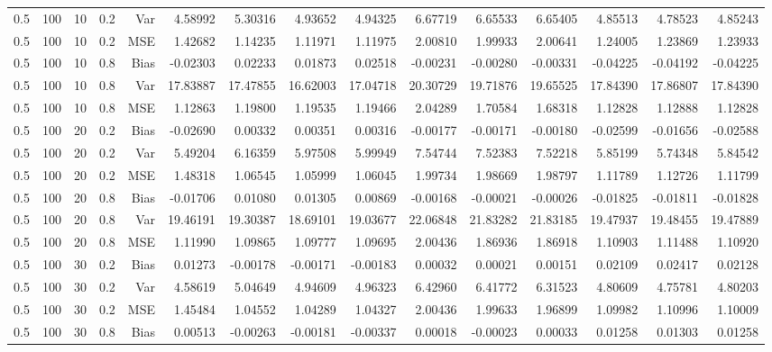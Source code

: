 \begin{table}[!htbp]
\begin{tabular}{lrrrrrrrrrrrrrr}
0.5 & 100 & 10 & 0.2 & Var & 4.58992 & 5.30316 & 4.93652 & 4.94325 & 6.67719 & 6.65533 & 6.65405 & 4.85513 & 4.78523 & 4.85243 \\
0.5 & 100 & 10 & 0.2 & MSE & 1.42682 & 1.14235 & 1.11971 & 1.11975 & 2.00810 & 1.99933 & 2.00641 & 1.24005 & 1.23869 & 1.23933 \\
0.5 & 100 & 10 & 0.8 & Bias & -0.02303 & 0.02233 & 0.01873 & 0.02518 & -0.00231 & -0.00280 & -0.00331 & -0.04225 & -0.04192 & -0.04225 \\
0.5 & 100 & 10 & 0.8 & Var & 17.83887 & 17.47855 & 16.62003 & 17.04718 & 20.30729 & 19.71876 & 19.65525 & 17.84390 & 17.86807 & 17.84390 \\
0.5 & 100 & 10 & 0.8 & MSE & 1.12863 & 1.19800 & 1.19535 & 1.19466 & 2.04289 & 1.70584 & 1.68318 & 1.12828 & 1.12888 & 1.12828 \\
0.5 & 100 & 20 & 0.2 & Bias & -0.02690 & 0.00332 & 0.00351 & 0.00316 & -0.00177 & -0.00171 & -0.00180 & -0.02599 & -0.01656 & -0.02588 \\
0.5 & 100 & 20 & 0.2 & Var & 5.49204 & 6.16359 & 5.97508 & 5.99949 & 7.54744 & 7.52383 & 7.52218 & 5.85199 & 5.74348 & 5.84542 \\
0.5 & 100 & 20 & 0.2 & MSE & 1.48318 & 1.06545 & 1.05999 & 1.06045 & 1.99734 & 1.98669 & 1.98797 & 1.11789 & 1.12726 & 1.11799 \\
0.5 & 100 & 20 & 0.8 & Bias & -0.01706 & 0.01080 & 0.01305 & 0.00869 & -0.00168 & -0.00021 & -0.00026 & -0.01825 & -0.01811 & -0.01828 \\
0.5 & 100 & 20 & 0.8 & Var & 19.46191 & 19.30387 & 18.69101 & 19.03677 & 22.06848 & 21.83282 & 21.83185 & 19.47937 & 19.48455 & 19.47889 \\
0.5 & 100 & 20 & 0.8 & MSE & 1.11990 & 1.09865 & 1.09777 & 1.09695 & 2.00436 & 1.86936 & 1.86918 & 1.10903 & 1.11488 & 1.10920 \\
0.5 & 100 & 30 & 0.2 & Bias & 0.01273 & -0.00178 & -0.00171 & -0.00183 & 0.00032 & 0.00021 & 0.00151 & 0.02109 & 0.02417 & 0.02128 \\
0.5 & 100 & 30 & 0.2 & Var & 4.58619 & 5.04649 & 4.94609 & 4.96323 & 6.42960 & 6.41772 & 6.31523 & 4.80609 & 4.75781 & 4.80203 \\
0.5 & 100 & 30 & 0.2 & MSE & 1.45484 & 1.04552 & 1.04289 & 1.04327 & 2.00436 & 1.99633 & 1.96899 & 1.09982 & 1.10996 & 1.10009 \\
0.5 & 100 & 30 & 0.8 & Bias & 0.00513 & -0.00263 & -0.00181 & -0.00337 & 0.00018 & -0.00023 & 0.00033 & 0.01258 & 0.01303 & 0.01258 \\

\end{tabular}
\end{table}
